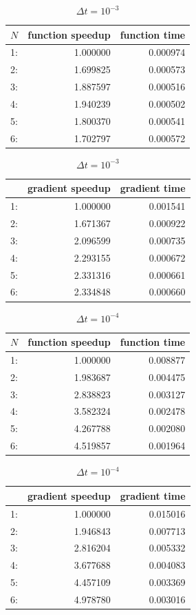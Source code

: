 \begin{table}[!h]
\centering
\caption{$\Delta t=10^{-3}$}
\begin{tabular}{lrr}
\toprule
{}$N$ &  function speedup &     function time \\
\midrule
1: &  1.000000 &  0.000974 \\
2: &  1.699825 &  0.000573 \\
3: &  1.887597 &  0.000516 \\
4: &  1.940239 &  0.000502 \\
5: &  1.800370 &  0.000541 \\
6: &  1.702797 &  0.000572 \\
\bottomrule
\end{tabular}
\begin{tabular}{lrr}
\toprule
{} &  gradient speedup &    gradient time \\
\midrule
1: &  1.000000 &  0.001541 \\
2: &  1.671367 &  0.000922 \\
3: &  2.096599 &  0.000735 \\
4: &  2.293155 &  0.000672 \\
5: &  2.331316 &  0.000661 \\
6: &  2.334848 &  0.000660 \\
\bottomrule
\end{tabular}
\end{table}
\begin{table}[!h]
\centering
\caption{$\Delta t=10^{-4}$}
\begin{tabular}{lrr}
\toprule
{} $N$&  function speedup &    function  time \\
\midrule
1: &  1.000000 &  0.008877 \\
2: &  1.983687 &  0.004475 \\
3: &  2.838823 &  0.003127 \\
4: &  3.582324 &  0.002478 \\
5: &  4.267788 &  0.002080 \\
6: &  4.519857 &  0.001964 \\
\bottomrule
\end{tabular}
\begin{tabular}{lrr}
\toprule
{} &  gradient speedup &     gradient time \\
\midrule
1: &  1.000000 &  0.015016 \\
2: &  1.946843 &  0.007713 \\
3: &  2.816204 &  0.005332 \\
4: &  3.677688 &  0.004083 \\
5: &  4.457109 &  0.003369 \\
6: &  4.978780 &  0.003016 \\
\bottomrule
\end{tabular}
\end{table}
